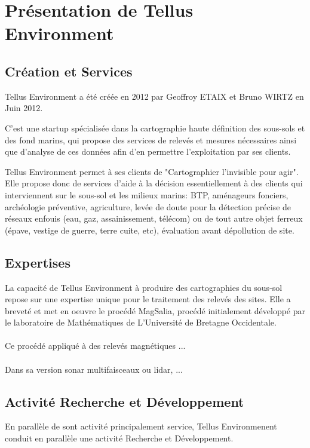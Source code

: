\documentclass[12pt,a4paper]{report}
\begin{document}
\section{Présentation de Tellus Environment}
\subsection{Création et Services}
Tellus Environment a été créée en 2012 par Geoffroy ETAIX et Bruno WIRTZ en Juin 2012.

C'est une startup spécialisée dans la cartographie haute  définition des sous-sols et des fond marins, qui propose des services de relevés et mesures nécessaires ainsi que d'analyse de ces données afin d'en permettre l'exploitation par ses clients.

Tellus Environment permet à ses clients de "Cartographier l'invisible pour agir". Elle propose donc de services d'aide à la décision essentiellement à des clients qui interviennent sur le sous-sol et les milieux marins: BTP, aménageurs fonciers, archéologie préventive, agriculture, levée de doute pour la détection précise de réseaux enfouis (eau, gaz, assainissement, télécom) ou de tout autre objet ferreux (épave, vestige de guerre, terre cuite, etc), évaluation avant dépollution de site.

\subsection{Expertises}
La capacité de Tellus Environment à produire des cartographies du sous-sol repose  sur une expertise unique pour le traitement des relevés des sites. Elle a breveté et met en oeuvre le procédé MagSalia, procédé initialement développé par le laboratoire de Mathématiques de L'Université de Bretagne Occidentale.

\paragraph{} Ce procédé appliqué à des relevés magnétiques ...

\paragraph{} Dans sa version sonar multifaisceaux ou lidar, ...

\subsection{Activité Recherche et Développement}
En parallèle de sont activité principalement service, Tellus Environmenent conduit en parallèle une activité Recherche et Développement.
\end{document}
